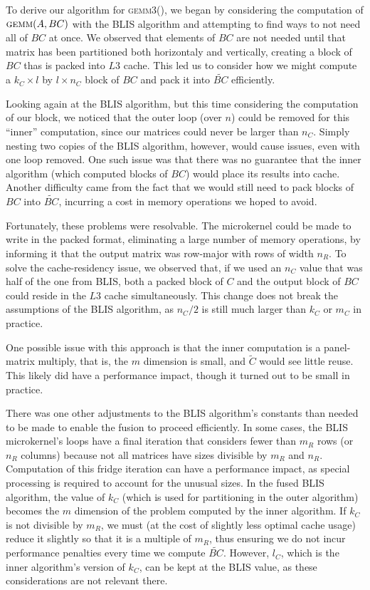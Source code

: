 \documentclass[12pt]{article}
\newcommand*{\gemmt}{{\textsc{gemm3()}}}
\begin{document}
To derive our algorithm for \gemmt{}, we began by considering the computation of $\textsc{gemm}(A, BC)$ with the BLIS algorithm and attempting to find ways to not need all of $BC$ at once.
We observed that elements of $BC$ are not needed until that matrix has been partitioned both horizontaly and vertically, creating a block of $BC$ thas is packed into $L3$ cache.
This led us to consider how we might compute a $k_C \times l$ by $l \times n_C$ block of $BC$ and pack it into $\tilde{BC}$ efficiently.

Looking again at the BLIS algorithm, but this time considering the computation of our block, we noticed that the outer loop (over $n$) could be removed for this ``inner'' computation, since our matrices could never be larger than $n_C$.
Simply nesting two copies of the BLIS algorithm, however, would cause issues, even with one loop removed.
One such issue was that there was no guarantee that the inner algorithm (which computed blocks of $BC$) would place its results into cache.
Another difficulty came from the fact that we would still need to pack blocks of $BC$ into $\tilde{BC}$, incurring a cost in memory operations we hoped to avoid.

Fortunately, these problems were resolvable.
The microkernel could be made to write in the packed format, eliminating a large number of memory operations, by informing it that the output matrix was row-major with rows of width $n_R$.
To solve the cache-residency issue, we observed that, if we used an $n_C$ value that was half of the one from BLIS, both a packed block of $C$ and the output block of $BC$ could reside in the $L3$ cache simultaneously.
This change does not break the assumptions of the BLIS algorithm, as $n_C/2$ is still much larger than $k_C$ or $m_C$ in practice.

One possible issue with this approach is that the inner computation is a panel-matrix multiply, that is, the $m$ dimension is small, and $\tilde{C}$ would see little reuse.
This likely did have a performance impact, though it turned out to be small in practice.

There was one other adjustments to the BLIS algorithm's constants than needed to be made to enable the fusion to proceed efficiently.
In some cases, the BLIS microkernel's loops have a final iteration that considers fewer than $m_R$ rows (or $n_R$ columns) because not all matrices have sizes divisible by $m_R$ and $n_R$.
Computation of this fridge iteration can have a performance impact, as special processing is required to account for the unusual sizes.
In the fused BLIS algorithm, the value of $k_C$ (which is used for partitioning in the outer algorithm) becomes the $m$ dimension of the problem computed by the inner algorithm.
If $k_C$ is not divisible by $m_R$, we must (at the cost of slightly less optimal cache usage) reduce it slightly so that it is a multiple of $m_R$, thus ensuring we do not incur performance penalties every time we compute $\tilde{BC}$.
However, $l_C$, which is the inner algorithm's version of $k_C$, can be kept at the BLIS value, as these considerations are not relevant there.
\end{document}
